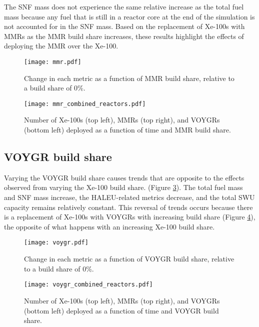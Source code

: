 The \gls{SNF} mass does not experience the same 
relative increase as the total fuel mass because any fuel that is still in a 
reactor core at the end of the simulation is not accounted for in the 
\gls{SNF} mass. 
Based on the replacement of Xe-100s with \glspl{MMR} as the \gls{MMR} 
build share increases, these results highlight the effects of deploying the
\gls{MMR} over the Xe-100. 

\begin{figure}[ht]
    \centering
    \texttt{[image: mmr.pdf]}
    \caption{Change in each metric as a function of MMR build share, 
    relative to a build share of 0\%.}
    \label{fig:mmr_scenario7}
\end{figure}


\begin{figure}[ht]
    \centering
    \texttt{[image: mmr\_combined\_reactors.pdf]}
    \caption{Number of Xe-100s (top left), MMRs (top right), and 
    VOYGRs (bottom left) deployed as a function of time and 
    MMR build share.}
    \label{fig:mmr_reactors_s7}
\end{figure}


\subsection{VOYGR build share}
Varying the VOYGR build share causes trends that are opposite 
to the effects observed from varying the Xe-100 build share. 
(Figure 
\ref{fig:voygr_scenario7}). The total fuel mass and \gls{SNF} mass 
increase, the \gls{HALEU}-related metrics decrease, and the total 
\gls{SWU} capacity remains relatively constant. This reversal 
of trends occurs because there is a replacement of Xe-100s with VOYGRs
with increasing build share (Figure \ref{fig:voygr_reactors_s7}), 
the opposite of what happens with an increasing Xe-100 build share. 

\begin{figure}[ht]
    \centering
    \texttt{[image: voygr.pdf]}
    \caption{Change in each metric as a function of VOYGR build share, 
    relative to a build share of 0\%.}
    \label{fig:voygr_scenario7}
\end{figure}

\begin{figure}[ht]
    \centering
    \texttt{[image: voygr\_combined\_reactors.pdf]}
    \caption{Number of Xe-100s (top left), MMRs (top right), and 
    VOYGRs (bottom left) deployed as a function of time and 
    VOYGR build share.}
    \label{fig:voygr_reactors_s7}
\end{figure}

